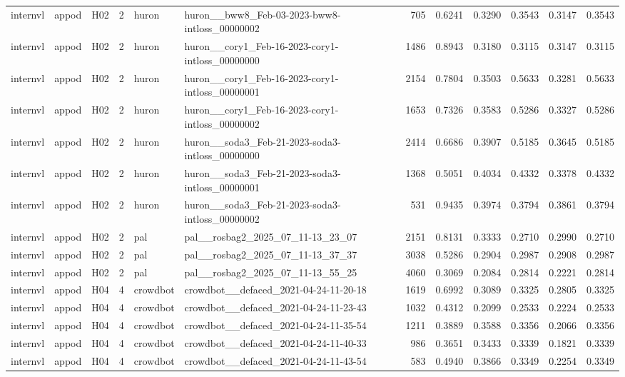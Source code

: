 \begin{table}[tbp]
\begin{tabular}{lllrllrrrrrr}
internvl & appod & H02 & 2 & huron & huron\_\_bww8\_Feb-03-2023-bww8-intloss\_00000002 & 705 & 0.6241 & 0.3290 & 0.3543 & 0.3147 & 0.3543 \\
internvl & appod & H02 & 2 & huron & huron\_\_cory1\_Feb-16-2023-cory1-intloss\_00000000 & 1486 & 0.8943 & 0.3180 & 0.3115 & 0.3147 & 0.3115 \\
internvl & appod & H02 & 2 & huron & huron\_\_cory1\_Feb-16-2023-cory1-intloss\_00000001 & 2154 & 0.7804 & 0.3503 & 0.5633 & 0.3281 & 0.5633 \\
internvl & appod & H02 & 2 & huron & huron\_\_cory1\_Feb-16-2023-cory1-intloss\_00000002 & 1653 & 0.7326 & 0.3583 & 0.5286 & 0.3327 & 0.5286 \\
internvl & appod & H02 & 2 & huron & huron\_\_soda3\_Feb-21-2023-soda3-intloss\_00000000 & 2414 & 0.6686 & 0.3907 & 0.5185 & 0.3645 & 0.5185 \\
internvl & appod & H02 & 2 & huron & huron\_\_soda3\_Feb-21-2023-soda3-intloss\_00000001 & 1368 & 0.5051 & 0.4034 & 0.4332 & 0.3378 & 0.4332 \\
internvl & appod & H02 & 2 & huron & huron\_\_soda3\_Feb-21-2023-soda3-intloss\_00000002 & 531 & 0.9435 & 0.3974 & 0.3794 & 0.3861 & 0.3794 \\
internvl & appod & H02 & 2 & pal & pal\_\_rosbag2\_2025\_07\_11-13\_23\_07 & 2151 & 0.8131 & 0.3333 & 0.2710 & 0.2990 & 0.2710 \\
internvl & appod & H02 & 2 & pal & pal\_\_rosbag2\_2025\_07\_11-13\_37\_37 & 3038 & 0.5286 & 0.2904 & 0.2987 & 0.2908 & 0.2987 \\
internvl & appod & H02 & 2 & pal & pal\_\_rosbag2\_2025\_07\_11-13\_55\_25 & 4060 & 0.3069 & 0.2084 & 0.2814 & 0.2221 & 0.2814 \\
internvl & appod & H04 & 4 & crowdbot & crowdbot\_\_defaced\_2021-04-24-11-20-18 & 1619 & 0.6992 & 0.3089 & 0.3325 & 0.2805 & 0.3325 \\
internvl & appod & H04 & 4 & crowdbot & crowdbot\_\_defaced\_2021-04-24-11-23-43 & 1032 & 0.4312 & 0.2099 & 0.2533 & 0.2224 & 0.2533 \\
internvl & appod & H04 & 4 & crowdbot & crowdbot\_\_defaced\_2021-04-24-11-35-54 & 1211 & 0.3889 & 0.3588 & 0.3356 & 0.2066 & 0.3356 \\
internvl & appod & H04 & 4 & crowdbot & crowdbot\_\_defaced\_2021-04-24-11-40-33 & 986 & 0.3651 & 0.3433 & 0.3339 & 0.1821 & 0.3339 \\
internvl & appod & H04 & 4 & crowdbot & crowdbot\_\_defaced\_2021-04-24-11-43-54 & 583 & 0.4940 & 0.3866 & 0.3349 & 0.2254 & 0.3349 \\

\end{tabular}
\end{table}
